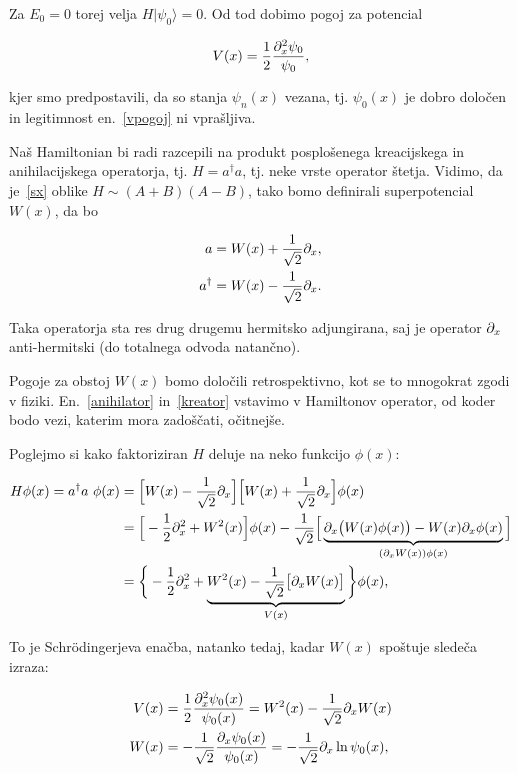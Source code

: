 \ni Za $E_0 = 0$ torej velja $H|\psi_0\rangle = 0$. Od tod dobimo pogoj za potencial

\begin{equation}
	V(x) = \frac{1}{2}\frac{\partial_x^2\psi_0}{\psi_0},
	\label{vpogoj}
\end{equation}

\ni kjer smo predpostavili, da so stanja $\psi_n(x)$ vezana, tj. $\psi_0(x)$ je dobro dolo\v cen in legitimnost
en.~\eqref{vpogoj} ni vpra\v sljiva.

Na\v s Hamiltonian bi radi razcepili na produkt posplo\v senega kreacijskega in anihilacijskega operatorja, tj.
$H = a^\dagger a$, tj. neke vrste operator \v stetja. Vidimo, da je~\eqref{sx} oblike
$H \sim (A + B)(A - B)$, tako bomo definirali superpotencial $W(x)$, da bo

\begin{align}
	a &= W(x) + \frac{1}{\sqrt{2}}\partial_x,          \label{anihilator} \\
	a^\dagger &= W(x) - \frac{1}{\sqrt{2}}\partial_x.  \label{kreator}
\end{align}

\ni Taka operatorja sta res drug drugemu hermitsko adjungirana, saj je operator $\partial_x$ anti-hermitski (do totalnega
odvoda natan\v cno).

Pogoje za obstoj $W(x)$ bomo dolo\v cili retrospektivno, kot se to mnogokrat zgodi v fiziki.
En.~\eqref{anihilator} in~\eqref{kreator} vstavimo v Hamiltonov operator, od koder bodo vezi,
katerim mora zado\v s\v cati, o\v citnej\v se.

Poglejmo si kako faktoriziran $H$ deluje na neko funkcijo $\phi (x)$:

\begin{align}
	H\phi(x) = a^\dagger a\ \phi(x)&= \Big[W(x) - \frac{1}{\sqrt{2}}\partial_x\Big]\Big[W(x) +
		\frac{1}{\sqrt{2}}\partial_x\Big]\phi(x) \notag \\
	&= \Big[-\frac{1}{2}\partial_x^2 + W^2(x)\Big]\phi(x) - \frac{1}{\sqrt{2}}\Big[
		\underbrace{\partial_x \big(W(x)\phi(x)\big) - W(x)\partial_x\phi(x)}_{(\partial_x W(x))\phi(x)} \Big] \notag \\
	&= \bigg\{-\frac{1}{2}\partial_x^2 +
		\underbrace{W^2(x) - \frac{1}{\sqrt{2}}\big[\partial_x W(x)\big]}_{V(x)}\bigg\}\phi(x),
	\label{dokaz.aad}
\end{align}

\ni To je Schr\" odingerjeva ena\v cba, natanko tedaj, kadar $W (x)$ spo\v stuje slede\v ca izraza:

\begin{align}
	V(x) &=\frac{1}{2}\frac{\partial_x^2\psi_0(x)}{\psi_0(x)} = W^2(x) - \frac{1}{\sqrt{2}}\partial_x
		W(x) \label{riccati} \\
	W(x) &= -\frac{1}{\sqrt{2}}\frac{\partial_x\psi_0(x)}{\psi_0(x)} = -\frac{1}{\sqrt{2}} \partial_x \ln \psi_0 (x)\label{superpotencial},
\end{align}

